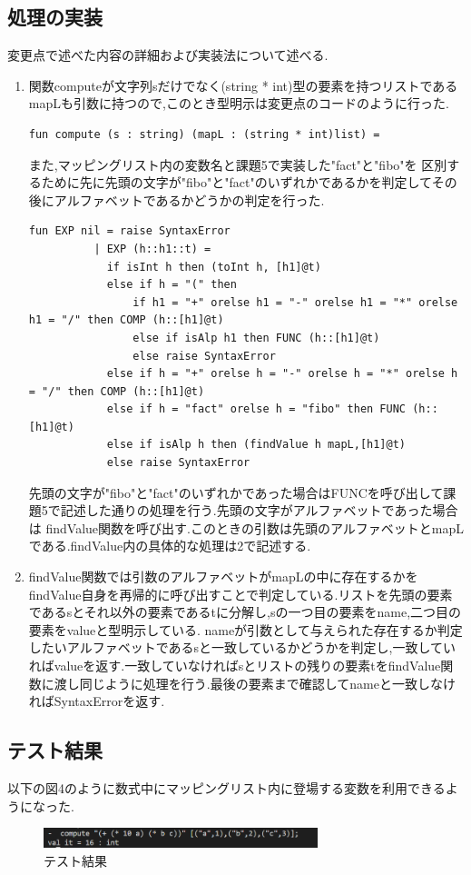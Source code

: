 \documentclass[dvipdfmx]{jarticle}
\begin{document}
\subsection{処理の実装}
変更点で述べた内容の詳細および実装法について述べる.
\begin{enumerate}
    \item 関数computeが文字列sだけでなく(string * int)型の要素を持つリストであるmapLも引数に持つので,このとき型明示は変更点のコードのように行った.
    \begin{lstlisting}[caption = 型変換,label = fuga]
    fun compute (s : string) (mapL : (string * int)list) =
    \end{lstlisting}
    また,マッピングリスト内の変数名と課題5で実装した"fact"と"fibo"を
    区別するために先に先頭の文字が"fibo"と"fact"のいずれかであるかを判定してその後にアルファベットであるかどうかの判定を行った.
    \begin{lstlisting}[caption = EXP関数の一部,label = fuga]
        fun EXP nil = raise SyntaxError
          | EXP (h::h1::t) =
            if isInt h then (toInt h, [h1]@t)
            else if h = "(" then 
                if h1 = "+" orelse h1 = "-" orelse h1 = "*" orelse h1 = "/" then COMP (h::[h1]@t)
                else if isAlp h1 then FUNC (h::[h1]@t)
                else raise SyntaxError
            else if h = "+" orelse h = "-" orelse h = "*" orelse h = "/" then COMP (h::[h1]@t)
            else if h = "fact" orelse h = "fibo" then FUNC (h::[h1]@t)
            else if isAlp h then (findValue h mapL,[h1]@t) 
            else raise SyntaxError

    \end{lstlisting}
        先頭の文字が"fibo"と"fact"のいずれかであった場合はFUNCを呼び出して課題5で記述した通りの処理を行う.先頭の文字がアルファベットであった場合は
    findValue関数を呼び出す.このときの引数は先頭のアルファベットとmapLである.findValue内の具体的な処理は2で記述する.
    \item findValue関数では引数のアルファベットがmapLの中に存在するかをfindValue自身を再帰的に呼び出すことで判定している.リストを先頭の要素であるsとそれ以外の要素であるtに分解し,sの一つ目の要素をname,二つ目の要素をvalueと型明示している.
    nameが引数として与えられた存在するか判定したいアルファベットであるsと一致しているかどうかを判定し,一致していればvalueを返す.一致していなければsとリストの残りの要素tをfindValue関数に渡し同じように処理を行う.最後の要素まで確認してnameと一致しなければSyntaxErrorを返す.
\end{enumerate}
\subsection{テスト結果}
以下の図4のように数式中にマッピングリスト内に登場する変数を利用できるようになった.
\begin{figure}[h]
    \centering
    \includegraphics[width=8cm]{test5.png}
    \caption{テスト結果}
\end{figure}
\end{document}
